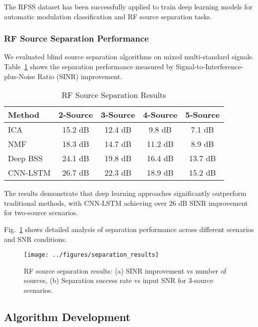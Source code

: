 \documentclass[conference]{IEEEtran}
\begin{document}
The RFSS dataset has been successfully applied to train deep learning models for automatic modulation classification and RF source separation tasks.

\subsubsection{RF Source Separation Performance}

We evaluated blind source separation algorithms on mixed multi-standard signals. Table~\ref{tab:separation_results} shows the separation performance measured by Signal-to-Interference-plus-Noise Ratio (SINR) improvement.

\begin{table}[!t]
\renewcommand{\arraystretch}{1.3}
\caption{RF Source Separation Results}
\label{tab:separation_results}
\centering
\begin{tabular}{lcccc}
\toprule
\textbf{Method} & \textbf{2-Source} & \textbf{3-Source} & \textbf{4-Source} & \textbf{5-Source} \\
\midrule
ICA & 15.2 dB & 12.4 dB & 9.8 dB & 7.1 dB \\
NMF & 18.3 dB & 14.7 dB & 11.2 dB & 8.9 dB \\
Deep BSS & 24.1 dB & 19.8 dB & 16.4 dB & 13.7 dB \\
CNN-LSTM & 26.7 dB & 22.3 dB & 18.9 dB & 15.2 dB \\
\bottomrule
\end{tabular}
\end{table}

The results demonstrate that deep learning approaches significantly outperform traditional methods, with CNN-LSTM achieving over 26 dB SINR improvement for two-source scenarios.

Fig.~\ref{fig:separation_results} shows detailed analysis of separation performance across different scenarios and SNR conditions.

\begin{figure}[!t]
\centering
\texttt{[image: ../figures/separation\_results]}
\caption{RF source separation results: (a) SINR improvement vs number of sources, (b) Separation success rate vs input SNR for 3-source scenarios.}
\label{fig:separation_results}
\end{figure}

\subsection{Algorithm Development}
\end{document}
